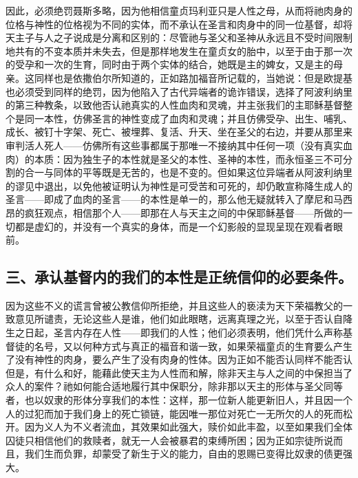 因此，必须绝罚聂斯多略，因为他相信童贞玛利亚只是人性之母，从而将祂肉身的位格与神性的位格视为不同的实体，而不承认在圣言和肉身中的同一位基督，却将天主子与人之子说成是分离和区别的：尽管祂与圣父和圣神从永远且不受时间限制地共有的不变本质并未失去，但是那样地发生在童贞女的胎中，以至于由于那一次的受孕和一次的生育，同时由于两个实体的结合，她既是主的婢女，又是主的母亲。这同样也是依撒伯尔所知道的，正如路加福音所记载的，当她说：但是欧提基也必须受到同样的绝罚，因为他陷入了古代异端者的诡诈错误，选择了阿波利纳里的第三种教条，以致他否认祂真实的人性血肉和灵魂，并主张我们的主耶稣基督整个是同一本性，仿佛圣言的神性变成了血肉和灵魂；并且仿佛受孕、出生、哺乳、成长、被钉十字架、死亡、被埋葬、复活、升天、坐在圣父的右边，并要从那里来审判活人死人——仿佛所有这些事都属于那唯一不接纳其中任何一项（没有真实血肉）的本质：因为独生子的本性就是圣父的本性、圣神的本性，而永恒圣三不可分割的合一与同体的平等既是无苦的，也是不变的。但如果这位异端者从阿波利纳里的谬见中退出，以免他被证明认为神性是可受苦和可死的，却仍敢宣称降生成人的圣言——即成了血肉的圣言——的本性是单一的，那么他无疑就转入了摩尼和马西昂的疯狂观点，相信那个人——即那在人与天主之间的中保耶稣基督——所做的一切都是虚幻的，并没有一个真实的身体，而是一个幻影般的显现呈现在观看者眼前。\par


\subsection{三、承认基督内的我们的本性是正统信仰的必要条件。}

因为这些不义的谎言曾被公教信仰所拒绝，并且这些人的亵渎为天下荣福教父的一致意见所谴责，无论这些人是谁，他们如此眼瞎，远离真理之光，以至于否认自降生之日起，圣言内存在人性——即我们的人性；他们必须表明，他们凭什么声称基督徒的名号，又以何种方式与真正的福音和谐一致，如果荣福童贞的生育要么产生了没有神性的肉身，要么产生了没有肉身的性体。因为正如不能否认同样不能否认但是，有什么和好，能藉此使天主为人性而和解，除非天主与人之间的中保担当了众人的案件？祂如何能合适地履行其中保职分，除非那以天主的形体与圣父同等者，也以奴隶的形体分享我们的本性：这样，那一位新人能更新旧人，并且因一个人的过犯而加于我们身上的死亡锁链，能因唯一那位对死亡一无所欠的人的死而松开。因为义人为不义者流血，其效果如此强大，赎价如此丰盈，以至如果我们全体囚徒只相信他们的救赎者，就无一人会被暴君的束缚所困；因为正如宗徒所说而且，我们生而负罪，却蒙受了新生于义的能力，自由的恩赐已变得比奴隶的债更强大。\par


